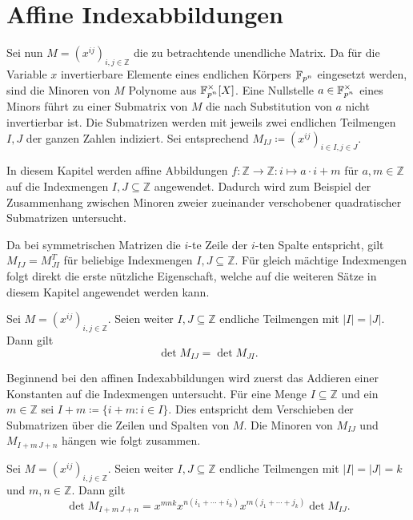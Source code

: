 \section{Affine Indexabbildungen} \label{sec:indextransformationen}

Sei nun $M = \left( x^{ij} \right)_{i,j \in \mathbb{Z}}$ die zu betrachtende unendliche Matrix. Da für die Variable $x$ invertierbare Elemente eines endlichen Körpers $\field{p}[n]$ eingesetzt werden, sind die Minoren von $M$ Polynome aus $\field{p}[n]^\times [X]$. Eine Nullstelle $a \in \field{p}[n]^\times$ eines Minors führt zu einer Submatrix von $M$ die nach Substitution von $a$ nicht invertierbar ist. Die Submatrizen werden mit jeweils zwei endlichen Teilmengen $I,J$ der ganzen Zahlen indiziert. Sei entsprechend $M_{IJ} \coloneqq \left( x^{ij} \right)_{i \in I,j \in J}$.

In diesem Kapitel werden affine Abbildungen $f:\mathbb{Z} \rightarrow \mathbb{Z}: i \mapsto a\cdot i + m$ für $a,m \in \mathbb{Z}$ auf die Indexmengen $I,J \subseteq \mathbb{Z}$ angewendet. Dadurch wird zum Beispiel der Zusammenhang zwischen Minoren zweier zueinander verschobener quadratischer Submatrizen untersucht.

Da bei symmetrischen Matrizen die $i$-te Zeile der $i$-ten Spalte entspricht, gilt $M_{IJ} = M_{JI}^T$ für beliebige Indexmengen $I,J \subseteq \mathbb{Z}$. Für gleich mächtige Indexmengen folgt direkt die erste nützliche Eigenschaft, welche auf die weiteren Sätze in diesem Kapitel angewendet werden kann.

\begin{satz}
    Sei $M = \left( x^{ij} \right)_{i,j \in \mathbb{Z}}$. Seien weiter $I,J \subseteq \mathbb{Z}$ endliche Teilmengen mit $|I|=|J|$. Dann gilt
    \begin{equation*}
        \det{} M_{IJ} = \det M_{JI}.
    \end{equation*}
\end{satz}

Beginnend bei den affinen Indexabbildungen wird zuerst das Addieren einer Konstanten auf die Indexmengen untersucht. Für eine Menge $I \subseteq \mathbb{Z}$ und ein $m \in \mathbb{Z}$ sei $I+m \coloneqq \{i+m:i\in I\}$. Dies entspricht dem Verschieben der Submatrizen über die Zeilen und Spalten von $M$. Die Minoren von $M_{IJ}$ und $M_{I+m\,J+n}$ hängen wie folgt zusammen.

\begin{satz} \label{satz:translation}
    Sei $M = \left( x^{ij} \right)_{i,j \in \mathbb{Z}}$. Seien weiter $I,J \subseteq \mathbb{Z}$ endliche Teilmengen mit ${|I|=|J|=k}$ und $m,n \in \mathbb{Z}$. Dann gilt
    \begin{equation*}
        \det{} M_{I+m\,J+n} = x^{mnk} x^{n(i_1+\cdots +i_k)} x^{m(j_1 +\cdots + j_k)} \det{} M_{IJ}.
    \end{equation*}
\end{satz}

